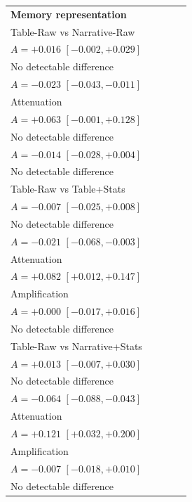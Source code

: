 \begin{table}[t]
\begin{tabular}{lp{3.35cm}p{3.35cm}p{3.35cm}p{3.35cm}}
\multicolumn{5}{l}{\textbf{Memory representation}} \\
Table-Raw vs Narrative-Raw & \shortstack{$S_{\mathrm{fixed}}=0.046,\; S_{\mathrm{LLM}}=0.062$\\$A=+0.016$ $[-0.002, +0.029]$\\No detectable difference} & \shortstack{$S_{\mathrm{fixed}}=0.025,\; S_{\mathrm{LLM}}=0.002$\\$A=-0.023$ $[-0.043, -0.011]$\\Attenuation} & \shortstack{$S_{\mathrm{fixed}}=0.027,\; S_{\mathrm{LLM}}=0.090$\\$A=+0.063$ $[-0.001, +0.128]$\\No detectable difference} & \shortstack{$S_{\mathrm{fixed}}=0.019,\; S_{\mathrm{LLM}}=0.005$\\$A=-0.014$ $[-0.028, +0.004]$\\No detectable difference} \\
Table-Raw vs Table+Stats & \shortstack{$S_{\mathrm{fixed}}=0.021,\; S_{\mathrm{LLM}}=0.013$\\$A=-0.007$ $[-0.025, +0.008]$\\No detectable difference} & \shortstack{$S_{\mathrm{fixed}}=0.048,\; S_{\mathrm{LLM}}=0.027$\\$A=-0.021$ $[-0.068, -0.003]$\\Attenuation} & \shortstack{$S_{\mathrm{fixed}}=0.025,\; S_{\mathrm{LLM}}=0.107$\\$A=+0.082$ $[+0.012, +0.147]$\\Amplification} & \shortstack{$S_{\mathrm{fixed}}=0.010,\; S_{\mathrm{LLM}}=0.010$\\$A=+0.000$ $[-0.017, +0.016]$\\No detectable difference} \\
Table-Raw vs Narrative+Stats & \shortstack{$S_{\mathrm{fixed}}=0.030,\; S_{\mathrm{LLM}}=0.043$\\$A=+0.013$ $[-0.007, +0.030]$\\No detectable difference} & \shortstack{$S_{\mathrm{fixed}}=0.089,\; S_{\mathrm{LLM}}=0.025$\\$A=-0.064$ $[-0.088, -0.043]$\\Attenuation} & \shortstack{$S_{\mathrm{fixed}}=0.018,\; S_{\mathrm{LLM}}=0.138$\\$A=+0.121$ $[+0.032, +0.200]$\\Amplification} & \shortstack{$S_{\mathrm{fixed}}=0.012,\; S_{\mathrm{LLM}}=0.005$\\$A=-0.007$ $[-0.018, +0.010]$\\No detectable difference} \\

\end{tabular}
\end{table}
